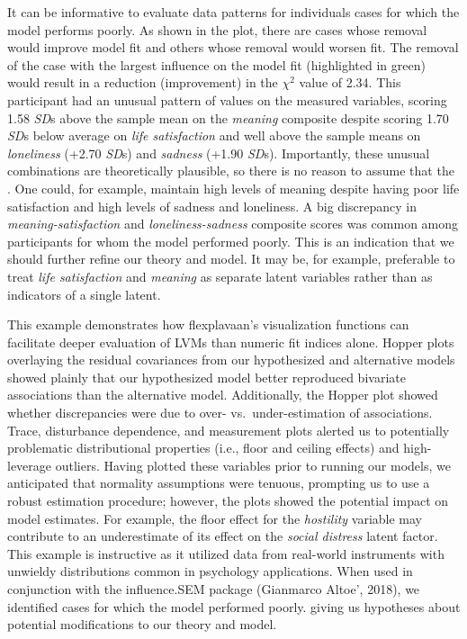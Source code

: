 \documentclass[
  english,
  doc]{apa6}
\begin{document}
It can be informative to evaluate data patterns for individuals cases for which the model performs poorly. As shown in the plot, there are cases whose removal would improve model fit and others whose removal would worsen fit. The removal of the case with the largest influence on the model fit (highlighted in green) would result in a reduction (improvement) in the \(\chi^2\) value of 2.34. This participant had an unusual pattern of values on the measured variables, scoring 1.58 \emph{SD}s above the sample mean on the \emph{meaning} composite despite scoring 1.70 \emph{SD}s below average on \emph{life satisfaction} and well above the sample means on \emph{loneliness} (+2.70 \emph{SD}s) and \emph{sadness} (+1.90 \emph{SD}s). Importantly, these unusual combinations are theoretically plausible, so there is no reason to assume that the . One could, for example, maintain high levels of meaning despite having poor life satisfaction and high levels of sadness and loneliness. A big discrepancy in \emph{meaning-satisfaction} and \emph{loneliness-sadness} composite scores was common among participants for whom the model performed poorly. This is an indication that we should further refine our theory and model. It may be, for example, preferable to treat \emph{life satisfaction} and \emph{meaning} as separate latent variables rather than as indicators of a single latent.

This example demonstrates how flexplavaan's visualization functions can facilitate deeper evaluation of LVMs than numeric fit indices alone. Hopper plots overlaying the residual covariances from our hypothesized and alternative models showed plainly that our hypothesized model better reproduced bivariate associations than the alternative model. Additionally, the Hopper plot showed whether discrepancies were due to over- vs.~under-estimation of associations. Trace, disturbance dependence, and measurement plots alerted us to potentially problematic distributional properties (i.e., floor and ceiling effects) and high-leverage outliers. Having plotted these variables prior to running our models, we anticipated that normality assumptions were tenuous, prompting us to use a robust estimation procedure; however, the plots showed the potential impact on model estimates. For example, the floor effect for the \emph{hostility} variable may contribute to an underestimate of its effect on the \emph{social distress} latent factor. This example is instructive as it utilized data from real-world instruments with unwieldy distributions common in psychology applications. When used in conjunction with the influence.SEM package (Gianmarco Altoe', 2018), we identified cases for which the model performed poorly. giving us hypotheses about potential modifications to our theory and model.
\end{document}
